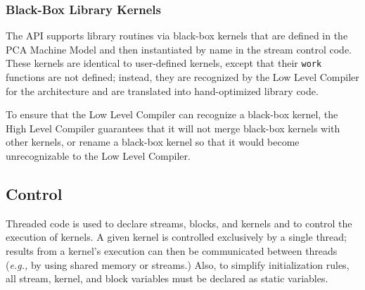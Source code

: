 \callc
\makeline

\subsubsection{Black-Box Library Kernels}
\label{sec:kernelllc}

The API supports library routines via black-box kernels that are
defined in the PCA Machine Model and then instantiated by name in the
stream control code.  These kernels are identical to user-defined
kernels, except that their {\tt work} functions are not defined;
instead, they are recognized by the Low Level Compiler for the
architecture and are translated into hand-optimized library code.

To ensure that the Low Level Compiler can recognize a black-box
kernel, the High Level Compiler guarantees that it will not merge
black-box kernels with other kernels, or rename a black-box kernel so
that it would become unrecognizable to the Low Level Compiler.

\subsection{Control}
\label{sec:control}

Threaded code is used to declare streams, blocks, and kernels and to
control the execution of kernels.  A given kernel is controlled
exclusively by a single thread; results from a kernel's execution can
then be communicated between threads ({\it e.g.,} by using shared
memory or streams.)  Also, to simplify initialization rules, all
stream, kernel, and block variables must be declared as static
variables.

